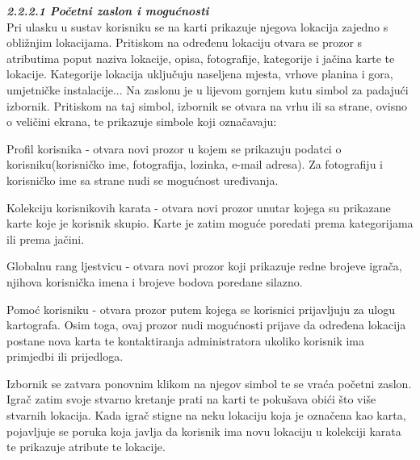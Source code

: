 		\textbf{\textit{\small2.2.2.1 Početni zaslon i mogućnosti}}\\
		
		
		{Pri ulasku u sustav korisniku se na karti prikazuje njegova lokacija zajedno s obližnjim lokacijama. Pritiskom na određenu lokaciju otvara se prozor s atributima poput naziva lokacije, opisa, fotografije, kategorije i jačina karte te lokacije. Kategorije lokacija uključuju naseljena mjesta, vrhove planina i gora, umjetničke instalacije... Na zaslonu je u lijevom gornjem kutu simbol za padajući izbornik. Pritiskom na taj simbol, izbornik se otvara na vrhu ili sa strane, ovisno o veličini ekrana, te prikazuje simbole koji označavaju:  }
		
			\begin{packed_item}
			\item {Profil korisnika - otvara novi prozor u kojem se prikazuju podatci o korisniku(korisničko ime, fotografija, lozinka, e-mail adresa). Za fotografiju i korisničko ime sa strane nudi se mogućnost uređivanja.}\\
			\item {Kolekciju korisnikovih karata - otvara novi prozor unutar kojega su prikazane karte koje je korisnik skupio. Karte je zatim moguće poredati prema kategorijama ili prema jačini.}\\
			\item {Globalnu rang ljestvicu - otvara novi prozor koji prikazuje redne brojeve igrača, njihova korisnička imena i brojeve bodova poredane silazno.}\\
			\item {Pomoć korisniku - otvara prozor putem kojega se korisnici prijavljuju za ulogu kartografa. Osim toga, ovaj prozor nudi mogućnosti prijave da određena lokacija postane nova karta te kontaktiranja administratora ukoliko korisnik ima primjedbi ili prijedloga. }
			\end{packed_item}
		
		{Izbornik se zatvara ponovnim klikom na njegov simbol te se vraća početni zaslon. Igrač zatim svoje stvarno kretanje prati na karti te pokušava obići što više stvarnih lokacija. Kada igrač stigne na neku lokaciju koja je označena kao karta, pojavljuje se poruka koja javlja da korisnik ima novu lokaciju u kolekciji karata te prikazuje atribute te lokacije.}\\ \\ \\
		
